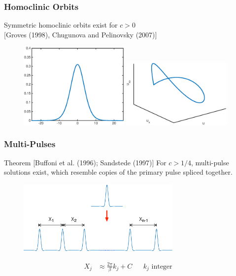 \documentclass[16pt]{beamer}
\begin{document}
\begin{frame}
	\frametitle{Homoclinic Orbits}
	\fontsize{16}{7.2}\selectfont

	Symmetric homoclinic orbits exist for $c > 0$ \\ \footnotesize [Groves (1998), Chugunova and Pelinovsky (2007)]

	\begin{figure}
   		\includegraphics[width=0.48\textwidth]{images/exactsol}
   		\includegraphics[width=0.48\textwidth]{images/exactsolorbit}
	\end{figure}
\end{frame}

\begin{frame}
\frametitle{Multi-Pulses} 
	\fontsize{14}{7.2}\selectfont
    \begin{block}{Theorem [Buffoni et al. (1996); Sandstede (1997)]}
    For $c > 1/4$, multi-pulse solutions exist, which resemble copies of the primary pulse spliced together.

	\begin{figure}
	\begin{center}
	\includegraphics[width=8cm]{images/multipulse.eps}
	\end{center}
	\end{figure}
	\begin{align*}
	 X_j &\approx \frac{2 \pi}{\beta} k_j + C && k_j \text{ integer}
	\end{align*}

    \end{block}
\end{frame}
\end{document}
